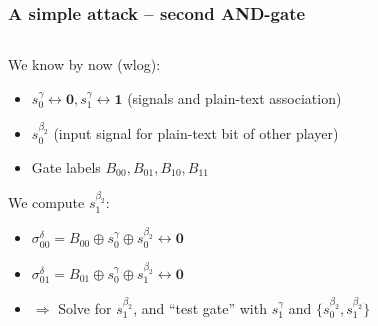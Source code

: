 \documentclass{beamer}
\begin{document}
\begin{frame}
  \frametitle{A simple attack -- second AND-gate}
  \begin{columns}
    \begin{column}{.75\textwidth}
      We know by now (wlog):
      \begin{itemize}
      \item $s^\gamma_0\leftrightarrow \mathbf{0}, s^\gamma_1\leftrightarrow \mathbf{1}$ (signals and plain-text association)
      \item $s_0^{\beta_2}$ (input signal for plain-text bit of other player)
      \item Gate labels $B_{00},B_{01},B_{10},B_{11}$
      \end{itemize}
      We compute $s_1^{\beta_2}$:
      \begin{itemize}
      \item<2-> $\sigma_{00}^\delta = B_{00} \oplus s_0^\gamma \oplus s_0^{\beta_2} \leftrightarrow \mathbf{0}$
      \item<2-> $\sigma_{01}^\delta = B_{01} \oplus s_0^\gamma \oplus s_1^{\beta_2} \leftrightarrow \mathbf{0}$
      \item<3->{$\Rightarrow$ Solve for $s_1^{\beta_2}$, and ``test gate'' with $s_1^\gamma$ and $\{ s_0^{\beta_2}, s_1^{\beta_2} \}$}
      \end{itemize}
    \end{column}
    \begin{column}{.25\textwidth}
      \begin{center}
      \end{center}      
    \end{column}
  \end{columns}
\end{frame}

\end{document}
